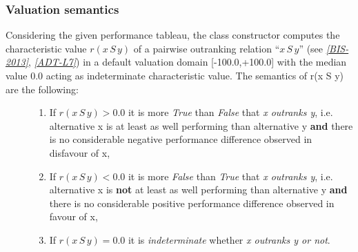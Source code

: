 \documentclass[letterpaper,10pt,english]{sphinxmanual}
\begin{document}
\subsubsection{Valuation semantics}
\label{tutorial:valuation-semantics}\begin{description}
\item[{Considering the given performance tableau, the {\hyperref[techDoc:outrankingDigraphs.BipolarOutrankingDigraph]{\emph{}}} class constructor computes the characteristic value \(r(x\,S\,y)\) of a pairwise outranking relation ``\(x\,S\,y\)'' (see \label{tutorial:id13}{\hyperref[tutorial:bis-2013]{\emph{{[}BIS-2013{]}}}}, \label{tutorial:id14}{\hyperref[tutorial:adt-l7]{\emph{{[}ADT-L7{]}}}}) in a default valuation domain {[}-100.0,+100.0{]} with the median value 0.0 acting as indeterminate characteristic value. The semantics of r(x S y) are the following:}] \leavevmode\begin{enumerate}
\item {} 
If \(r(x\,S\,y) > 0.0\) it is more \emph{True} than \emph{False} that \emph{x outranks y}, i.e. alternative x is at least as well performing than alternative y \textbf{and} there is no considerable negative performance difference observed in disfavour of x,

\item {} 
If \(r(x\,S\,y) < 0.0\) it is more \emph{False} than \emph{True} that \emph{x outranks y}, i.e. alternative x is \textbf{not} at least as well performing than alternative y \textbf{and} there is no considerable positive performance difference observed in favour of x,

\item {} 
If \(r(x\,S\,y) = 0.0\) it is \emph{indeterminate} whether \emph{x outranks y or not}.

\end{enumerate}


\end{description}
\end{document}
